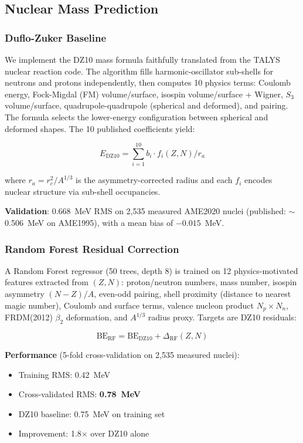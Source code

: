 \documentclass[letterpaper,11pt]{article}
\begin{document}
\subsection{Nuclear Mass Prediction}

\subsubsection{Duflo-Zuker Baseline}

We implement the DZ10 mass formula \citep{duflo1995} faithfully translated from
the TALYS nuclear reaction code. The algorithm fills harmonic-oscillator
sub-shells for neutrons and protons independently, then computes 10 physics
terms: Coulomb energy, Fock-Migdal (FM) volume/surface, isospin volume/surface +
Wigner, $S_3$ volume/surface, quadrupole-quadrupole (spherical and deformed),
and pairing. The formula selects the lower-energy configuration between spherical
and deformed shapes. The 10 published coefficients yield:

\begin{equation}
E_{\text{DZ10}} = \sum_{i=1}^{10} b_i \cdot f_i(Z, N) / r_a
\end{equation}

where $r_a = r_c^2 / A^{1/3}$ is the asymmetry-corrected radius and each $f_i$
encodes nuclear structure via sub-shell occupancies.

\textbf{Validation}: 0.668~MeV RMS on 2,535 measured AME2020 nuclei (published:
$\sim$0.506~MeV on AME1995), with a mean bias of $-0.015$~MeV.

\subsubsection{Random Forest Residual Correction}

A Random Forest regressor (50 trees, depth 8) is trained on 12
physics-motivated features extracted from $(Z, N)$: proton/neutron numbers, mass
number, isospin asymmetry $(N{-}Z)/A$, even-odd pairing, shell proximity
(distance to nearest magic number), Coulomb and surface terms, valence nucleon
product $N_p \times N_n$, FRDM(2012) $\beta_2$ deformation, and $A^{1/3}$
radius proxy. Targets are DZ10 residuals:

\begin{equation}
\text{BE}_{\text{RF}} = \text{BE}_{\text{DZ10}} + \Delta_{\text{RF}}(Z, N)
\end{equation}

\textbf{Performance} (5-fold cross-validation on 2,535 measured nuclei):
\begin{itemize}
\item Training RMS: 0.42~MeV
\item Cross-validated RMS: \textbf{0.78~MeV}
\item DZ10 baseline: 0.75~MeV on training set
\item Improvement: 1.8$\times$ over DZ10 alone
\end{itemize}
\end{document}
